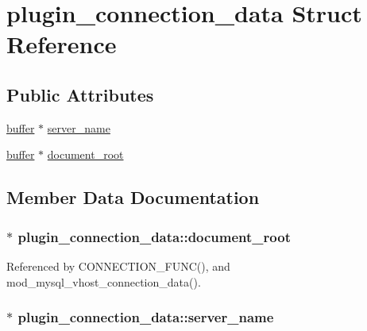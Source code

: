 \hypertarget{structplugin__connection__data}{\section{plugin\-\_\-connection\-\_\-data Struct Reference}
\label{structplugin__connection__data}
}
\subsection*{Public Attributes}
\begin{DoxyCompactItemize}
\item 
\hyperlink{structbuffer}{buffer} $\ast$ \hyperlink{structplugin__connection__data_ae4d8e75f2e2db380edade77706c8ddfc}{server\-\_\-name}
\item 
\hyperlink{structbuffer}{buffer} $\ast$ \hyperlink{structplugin__connection__data_a9e6ebaed2e7648cb940994c364ab1363}{document\-\_\-root}
\end{DoxyCompactItemize}


\subsection{Member Data Documentation}
\hypertarget{structplugin__connection__data_a9e6ebaed2e7648cb940994c364ab1363}{
\subsubsection[{document\-\_\-root}]{$\ast$ plugin\-\_\-connection\-\_\-data\-::document\-\_\-root}}\label{structplugin__connection__data_a9e6ebaed2e7648cb940994c364ab1363}


Referenced by C\-O\-N\-N\-E\-C\-T\-I\-O\-N\-\_\-\-F\-U\-N\-C(), and mod\-\_\-mysql\-\_\-vhost\-\_\-connection\-\_\-data().

\hypertarget{structplugin__connection__data_ae4d8e75f2e2db380edade77706c8ddfc}{
\subsubsection[{server\-\_\-name}]{$\ast$ plugin\-\_\-connection\-\_\-data\-::server\-\_\-name}}\label{structplugin__connection__data_ae4d8e75f2e2db380edade77706c8ddfc}


